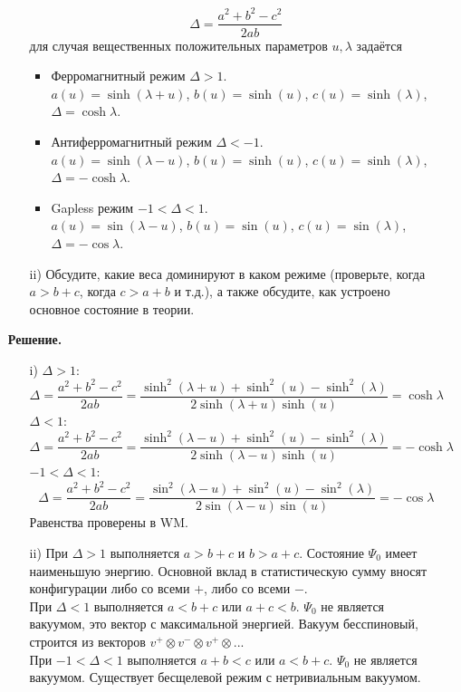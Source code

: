 \documentclass[12pt]{article}
\theoremstyle{definition}
\begin{document}
\begin{enumerate}
\begin{enumerate}
\begin{equation}
            \Delta=\frac{a^2+b^2-c^2}{2ab}
        \end{equation}
        для случая вещественных положительных параметров $u,\lambda$ задаётся
        \begin{itemize}
            \item Ферромагнитный режим $\Delta>1$.\\
            $a(u)=\sinh(\lambda+u)$, $b(u)=\sinh(u)$, $c(u)=\sinh(\lambda)$, $\Delta=\cosh\lambda$.
            \item Антиферромагнитный режим $\Delta<-1$.\\
            $a(u)=\sinh(\lambda-u)$, $b(u)=\sinh(u)$, $c(u)=\sinh(\lambda)$, $\Delta=-\cosh\lambda$.
            \item Gapless режим $-1<\Delta<1$.\\
            $a(u)=\sin(\lambda-u)$, $b(u)=\sin(u)$, $c(u)=\sin(\lambda)$, $\Delta=-\cos\lambda$.
        \end{itemize}
        \item[ii)] Обсудите, какие веса доминируют в каком режиме (проверьте, когда $a>b+c$, когда $c>a+b$ и т.д.), а также обсудите, как устроено основное состояние в теории.
    \end{enumerate}
    \textbf{Решение.}
    \begin{itemize}
        \item[i)] $\Delta>1$:
        \begin{equation}
            \Delta=\frac{a^2+b^2-c^2}{2ab}=\frac{\sinh^2(\lambda+u)+\sinh^2(u)-\sinh^2(\lambda)}{2\sinh(\lambda+u)\sinh(u)}=\cosh\lambda
        \end{equation}
        $\Delta<1$:
        \begin{equation}
            \Delta=\frac{a^2+b^2-c^2}{2ab}=\frac{\sinh^2(\lambda-u)+\sinh^2(u)-\sinh^2(\lambda)}{2\sinh(\lambda-u)\sinh(u)}=-\cosh{\lambda}
        \end{equation}
        $-1<\Delta<1$:
        \begin{equation}
            \Delta=\frac{a^2+b^2-c^2}{2ab}=\frac{\sin^2(\lambda-u)+\sin^2(u)-\sin^2(\lambda)}{2\sin(\lambda-u)\sin(u)}=-\cos\lambda
        \end{equation}
        Равенства проверены в WM.
        \item[ii)] При $\Delta>1$ выполняется $a>b+c$ и $b>a+c$. Состояние $\Psi_0$ имеет наименьшую энергию. Основной вклад в статистическую сумму вносят конфигурации либо со всеми $+$, либо со всеми $-$.\\
        При $\Delta<1$ выполняется $a<b+c$ или $a+c<b$. $\Psi_0$ не является вакуумом, это вектор с максимальной энергией. Вакуум бесспиновый, строится из векторов $v^+\otimes v^-\otimes v^+\otimes...$\\
        При $-1<\Delta<1$ выполняется $a+b<c$ или $a<b+c$. $\Psi_0$ не является вакуумом. Существует бесщелевой режим с нетривиальным вакуумом.
    \end{itemize}
\end{enumerate}
\end{document}
